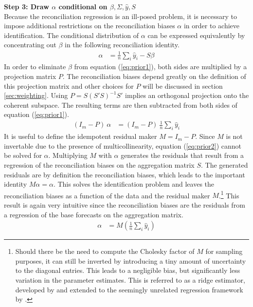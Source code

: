 \documentclass[a4paper,fleqn,11pt]{article}
\begin{document}
\clearpage
\noindent\textbf{Step 3: Draw $\alpha$ conditional on $\beta,\Sigma,\hat{y},S$}\\
Because the reconciliation regression is an ill-posed problem, it is necessary to impose additional restrictions on the reconciliation biases $\alpha$ in order to achieve identification. The conditional distribution of $\alpha$ can be expressed equivalently by concentrating out $\beta$ in the following reconciliation identity.
\begin{align}
	\label{eq:prior1}
	\alpha &= \frac{1}{n}\sum_i \hat{y}_i - S\beta
\end{align}
In order to eliminate $\beta$ from equation (\ref{eq:prior1}), both sides are multiplied by a projection matrix $P$. The reconciliation biases depend greatly on the definition of this projection matrix and other choices for $P$ will be discussed in section \ref{sec:weighting}. Using $P = S(S'S)^{-1}S'$ implies an orthogonal projection onto the coherent subspace. The resulting terms are then subtracted from both sides of equation (\ref{eq:prior1}).
\begin{align}
	\label{eq:prior2}
	(I_m - P)\ \alpha &= (I_m - P)\ \frac{1}{n}\sum_i \hat{y}_i  
\end{align}
It is useful to define the idempotent residual maker $M = I_m - P$. Since $M$ is not invertable due to the presence of multicollinearity, equation (\ref{eq:prior2}) cannot be solved for $\alpha$. Multiplying $M$ with $\alpha$ generates the residuals that result from a regression of the reconciliation biases on the aggregation matrix $S$. The generated residuals are by definition the reconciliation biases, which leads to the important identity $M\alpha = \alpha$. This solves the identification problem and leaves the reconciliation biases as a function of the data and the residual maker $M$.\footnote{Should there be the need to compute the Cholesky factor of $M$ for sampling purposes, it can still be inverted by introducing a tiny amount of uncertainty to the diagonal entries. This leads to a negligible bias, but significantly less variation in the parameter estimates. This is referred to as a ridge estimator, developed by \cite{Brown1980} and extended to the seemingly unrelated regression framework by \cite{Haitovsky1987}.} This result is again very intuitive since the reconciliation biases are the residuals from a regression of the base forecasts on the aggregation matrix.
\begin{align}
\alpha &= M\left(\frac{1}{n}\sum_i \hat{y}_i\right)
\end{align}
\end{document}
